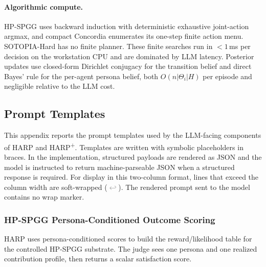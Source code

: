 \paragraph{Algorithmic compute.} HP-SPGG uses backward induction with deterministic exhaustive joint-action argmax, and compact Concordia enumerates its one-step finite action menu. SOTOPIA-Hard has no finite planner. These finite searches run in $<1$\,ms per decision on the workstation CPU and are dominated by LLM latency. Posterior updates use closed-form Dirichlet conjugacy for the transition belief and direct Bayes' rule for the per-agent persona belief, both $O(n|\Theta_i|H)$ per episode and negligible relative to the LLM cost.



\subsection{Prompt Templates}
\label{app:prompt-templates}

This appendix reports the prompt templates used by the LLM-facing components of
HARP and HARP\textsuperscript{+}. Templates are written with symbolic placeholders in braces. In
the implementation, structured payloads are rendered as JSON and the model is
instructed to return machine-parseable JSON when a structured response is
required. For display in this two-column format, lines that exceed the column
width are soft-wrapped (\textcolor{gray}{$\hookleftarrow$}). The rendered prompt
sent to the model contains no wrap marker.


\subsubsection{HP-SPGG Persona-Conditioned Outcome Scoring}
\label{app:prompt-hp-spgg-scoring}

HARP uses persona-conditioned scores to build the reward/likelihood table for
the controlled HP-SPGG substrate. The judge sees one persona and one
realized contribution profile, then returns a scalar satisfaction score.

